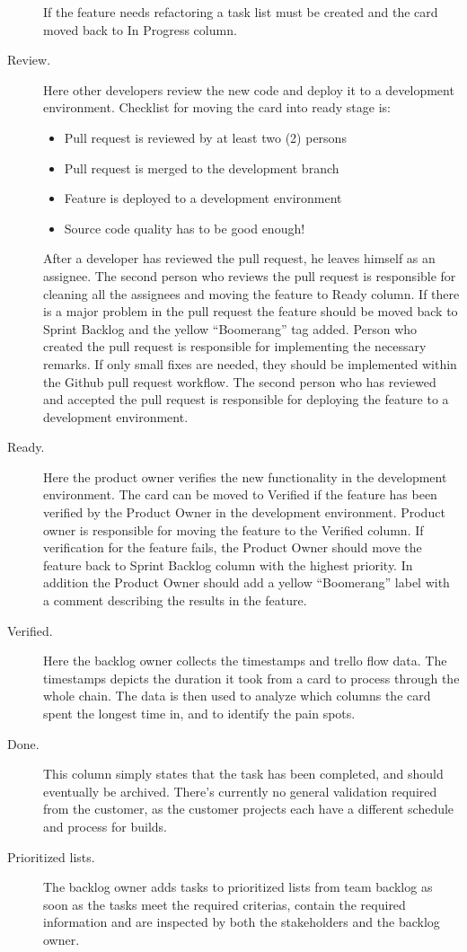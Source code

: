 \documentclass[english, grading]{tktltiki2}
\theoremstyle{definition}
\theoremstyle{remark}
\begin{document}
\begin{description}
\begin{itemize}
\end{itemize}
If the feature needs refactoring a task list must be created and the card moved back to In Progress column.
\item[Review.] Here other developers review the new code and deploy it to a development environment. Checklist for moving the card into ready stage is:
\begin{itemize}
	\item  Pull request is reviewed by at least two (2) persons
	\item  Pull request is merged to the development branch
	\item  Feature is deployed to a development environment
	\item  Source code quality has to be good enough!
\end{itemize}
After a developer has reviewed the pull request, he leaves himself as an assignee. The second person who reviews the pull request is responsible for cleaning all the assignees and moving the feature to Ready column. If there is a major problem in the pull request the feature should be moved back to Sprint Backlog and the yellow “Boomerang” tag added. Person who created the pull request is responsible for implementing the necessary remarks.
If only small fixes are needed, they should be implemented within the Github pull request workflow.
The second person who has reviewed and accepted the pull request is responsible for deploying the feature to a development environment.
\item[Ready.] Here the product owner verifies the new functionality in the development environment. The card can be moved to Verified if the feature has been verified by the Product Owner in the development environment. Product owner is responsible for moving the feature to the Verified column.
If verification for the feature fails, the Product Owner should move the feature back to Sprint Backlog column with the highest priority. In addition the Product Owner should add a yellow “Boomerang” label with a comment describing the results in the feature.
\item[Verified.] Here the backlog owner collects the timestamps and trello flow data. The timestamps depicts the duration it took from a card to process through the whole chain. The data is then used to analyze which columns the card spent the longest time in, and to identify the pain spots.
\item[Done.] This column simply states that the task has been completed, and should eventually be archived. There’s currently no general validation required from the customer, as the customer projects each have a different schedule and process for builds.
\item[Prioritized lists.] The backlog owner adds tasks to prioritized lists from team backlog as soon as the tasks meet the required criterias, contain the required information and are inspected by both the stakeholders and the backlog owner.
\end{description}
\end{document}
